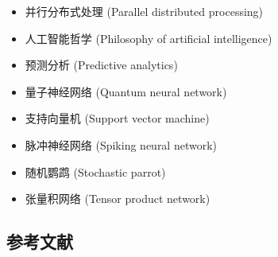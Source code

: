 \begin{itemize}
\item 并行分布式处理 (Parallel distributed processing)  
\item 人工智能哲学 (Philosophy of artificial intelligence)  
\item 预测分析 (Predictive analytics)  
\item 量子神经网络 (Quantum neural network)  
\item 支持向量机 (Support vector machine)  
\item 脉冲神经网络 (Spiking neural network)  
\item 随机鹦鹉 (Stochastic parrot)  
\item 张量积网络 (Tensor product network) 
\end{itemize} 
\subsection{参考文献}
